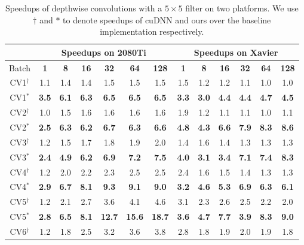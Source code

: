 \begin{table}[]
\setlength{\tabcolsep}{3.8pt}
\caption{Speedups of depthwise convolutions with a $5 \times 5$ filter on two platforms. We use ${\dag}$ and ${*}$ to denote speedups of cuDNN and ours over the baseline implementation respectively.}
\label{tab:dwconvf5}
\begin{threeparttable}
\begin{tabular}{c|cccccc|cccccc}
\toprule
&\multicolumn{6}{c|}{Speedups on 2080Ti} & \multicolumn{6}{c}{Speedups on Xavier}\\

\midrule
Batch& \textbf{1} & \textbf{8} & \textbf{16}& \textbf{32} & \textbf{64} & \textbf{128} & \textbf{1} & \textbf{8} & \textbf{16}& \textbf{32} & \textbf{64} & \textbf{128}\\
\hline
CV1$^{\dag}$&1.1 &1.4 &1.4 &1.5 &1.5 &1.5 &1.5 &1.2 &1.2 &1.1 &1.0 &1.0 \\
CV1$^{*}$&\textbf{3.5} &\textbf{6.1} &\textbf{6.3} &\textbf{6.5} &\textbf{6.5} &\textbf{6.5} &\textbf{3.3} &\textbf{3.0} &\textbf{4.4} &\textbf{4.4} &\textbf{4.7} &\textbf{4.5} \\
\hline
CV2$^{\dag}$&1.0 &1.5 &1.6 &1.6 &1.6 &1.6 &1.9 &1.2 &1.1 &1.1 &1.0 &1.1 \\
CV2$^{*}$&\textbf{2.5} &\textbf{6.3} &\textbf{6.2} &\textbf{6.7} &\textbf{6.3} &\textbf{6.6} &\textbf{4.8} &\textbf{4.3} &\textbf{6.6} &\textbf{7.9} &\textbf{8.3} &\textbf{8.6} \\
\hline
CV3$^{\dag}$&1.2 &1.5 &1.7 &1.8 &1.9 &2.0 &1.4 &1.6 &1.4 &1.3 &1.3 &1.3 \\
CV3$^{*}$&\textbf{2.4} &\textbf{4.9} &\textbf{6.2} &\textbf{6.9} &\textbf{7.2} &\textbf{7.5} &\textbf{4.0} &\textbf{3.1} &\textbf{3.4} &\textbf{7.1} &\textbf{7.4} &\textbf{8.3} \\
\hline
CV4$^{\dag}$&1.2 &2.0 &2.2 &2.3 &2.5 &2.5 &2.4 &1.6 &1.5 &1.4 &1.3 &1.3 \\
CV4$^{*}$&\textbf{2.9} &\textbf{6.7} &\textbf{8.1} &\textbf{9.3} &\textbf{9.1} &\textbf{9.0} &\textbf{3.2} &\textbf{4.6} &\textbf{5.3} &\textbf{6.9} &\textbf{6.3} &\textbf{6.1} \\
\hline
CV5$^{\dag}$&1.2 &2.1 &2.7 &3.6 &4.1 &4.6 &3.1 &2.3 &2.6 &2.5 &2.2 &2.0 \\
CV5$^{*}$&\textbf{2.8} &\textbf{6.5} &\textbf{8.1} &\textbf{12.7} &\textbf{15.6} &\textbf{18.7} &\textbf{3.6} &\textbf{4.7} &\textbf{7.7} &\textbf{3.9} &\textbf{8.3} &\textbf{9.0} \\
\hline
CV6$^{\dag}$&1.2 &1.8 &2.5 &3.2 &3.6 &3.8 &2.8 &1.8 &1.9 &2.0 &1.9 &1.8 \\

\end{tabular}
\end{threeparttable}
\end{table}

